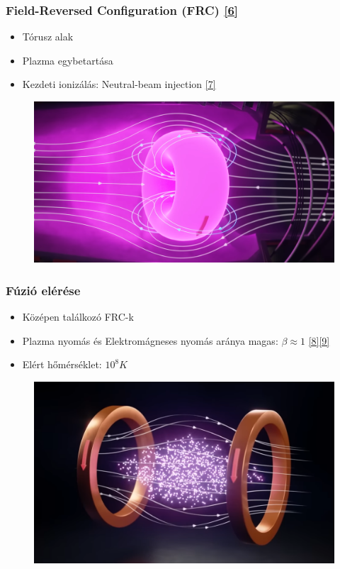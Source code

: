 \documentclass{beamer}
\begin{document}
\begin{frame}
    \frametitle{Field-Reversed Configuration (FRC) \hyperlink{6}{\small[6]}}
    \begin{itemize}
        \item Tórusz alak
        \item Plazma egybetartása
        \item Kezdeti ionizálás: Neutral-beam injection \hyperlink{7}{\small[7]}
    \end{itemize}
    \begin{figure}
        \includegraphics[scale=0.15]{field_reverse_config.png}
    \end{figure}
\end{frame}
\begin{frame}
    \frametitle{Fúzió elérése}
    \begin{itemize}
        \item Középen találkozó FRC-k
        \item Plazma nyomás és Elektromágneses nyomás aránya magas: $\beta \approx 1$ \hyperlink{8}{\small[8]}\hyperlink{9}{\small[9]}
        \item Elért hőmérséklet: $10^8K$
    \end{itemize}
    \begin{figure}
        \includegraphics[scale=0.2]{piston.png}
    \end{figure}
\end{frame}
\end{document}
